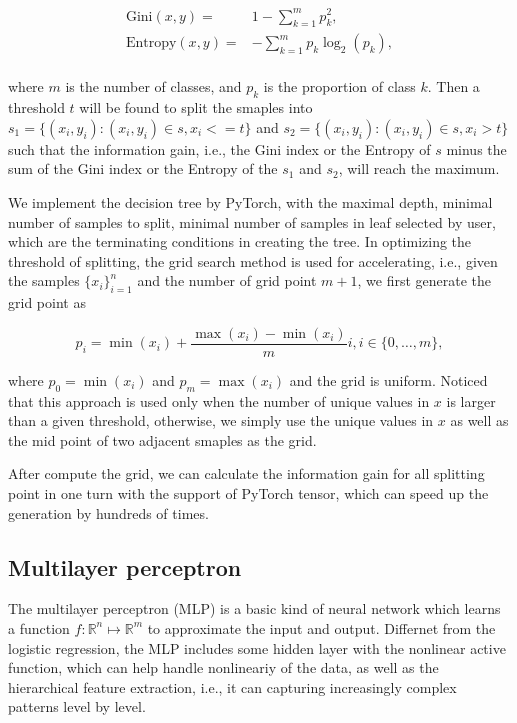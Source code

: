 \documentclass[11pt]{article}
\begin{document}
$$
  \begin{aligned}
    \text{Gini} (x, y) =    & 1 - \sum_{k=1}^m p_k^2,          \\
    \text{Entropy} (x, y) = & - \sum_{k=1}^m p_k \log_2 (p_k), \\
  \end{aligned}
$$

\noindent where $m$ is the number of classes, and $p_k$ is the proportion of class $k$. Then a threshold $t$ will be found to split the smaples into $s_1 = \{(x_i, y_i): (x_i, y_i) \in s, x_i <= t \}$ and $s_2 = \{(x_i, y_i): (x_i, y_i) \in s, x_i > t \}$ such that the information gain, i.e., the Gini index or the Entropy of $s$ minus the sum of the Gini index or the Entropy of the $s_1$ and $s_2$, will reach the maximum.

We implement the decision tree by PyTorch, with the maximal depth, minimal number of samples to split, minimal number of samples in leaf selected by user, which are the terminating conditions in creating the tree. In optimizing the threshold of splitting, the grid search method is used for accelerating, i.e., given the samples $\{x_i\}_{i=1}^n$ and the number of grid point $m + 1$, we first generate the grid point as

$$
  p_i = \min(x_i) + \frac{\max(x_i) - \min(x_i)}{m} i, i \in \{0, \dots, m\},
$$

\noindent where $p_0 = \min(x_i)$ and $p_{m} = \max(x_i)$ and the grid is uniform. Noticed that this approach is used only when the number of unique values in $x$ is larger than a given threshold, otherwise, we simply use the unique values in $x$ as well as the mid point of two adjacent smaples as the grid.

After compute the grid, we can calculate the information gain for all splitting point in one turn with the support of PyTorch tensor, which can speed up the generation by hundreds of times.

\subsection{Multilayer perceptron}

The multilayer perceptron (MLP) \cite{rosenblatt1958perceptron} \cite{rumelhart1986learning} is a basic kind of neural network which learns a function $f: \mathbb{R}^n \mapsto \mathbb{R}^m$ to approximate the input and output. Differnet from the logistic regression, the MLP includes some hidden layer with the nonlinear active function, which can help handle nonlineariy of the data, as well as the hierarchical feature extraction, i.e., it can capturing increasingly complex patterns level by level.
\end{document}
